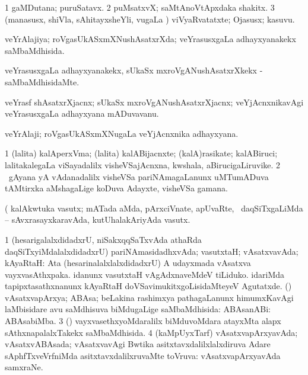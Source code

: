 \bentry
{} 
\gl{\nA}
\expl{}
\bmng
\bnum
\num{1} gaMDutana; puruSatavx. 
\num{2} puMsatxvX; saMtAnoVtApxdaka shakitx. 
\num{3} (manasusx, shiVla, sAhitayxsheYli, \mo vugaLa \vi) viVyaRvatatxte; Ojasusx; kasuvu. 
\enum
\emng
\eentry

\bentry 
{} 
\gl{\gu}
\expl{}
\bmng
 veYrAlajiya; roVgasUkASxmXNushAsatxrXda; veYrasusxgaLa adhayxyanakekx saMbaMdhisida. 
\emng
\eentry

\bentry
{} 
\gl{\kirxvi}
\expl{}
\bmng
 veYrasusxgaLa adhayxyanakekx, sUkaSx mxroVgANushAsatxrXkekx -saMbaMdhisidaMte. 
\emng
\eentry

\bentry
{} 
\gl{\nA}
\expl{}
\bmng
 veYrasf shAsatxrXjacnx; sUkaSx mxroVgANushAsatxrXjacnx; veYjAcnxnikavAgi veYrasusxgaLa adhayxyana mADuvavanu. 
\emng
\eentry

\bentry
{} 
\gl{\nA}
\expl{}
\bmng
 veYrAlaji; roVgasUkASxmXNugaLa veYjAcnxnika adhayxyana. 
\emng
\eentry

\bentry
{} 
\gl{\nA}
\expl{}
\bmng
\bnum
\num{1} (lalita) kalAperxVma; (lalita) kalABijacnxte; (kalA)rasikate; kalABiruci; lalitakalegaLa viSayadalilx visheVSajAcnxna, kwshala, aBirucigaLiruvike. 
\hypertarget{virtu(2)}{} 
\num{2} \kanmu\ gAyana yA vAdanadalilx visheVSa pariNAmagaLanunx uMTumADuva tAMtirxka aMshagaLige koDuva Adayxte, visheVSa gamana. 
\enum
\emng

\noindent 
\gl{\pagu}
\expl{}
\bmng
  (  kalAkwtuka vasutx; mATada aMda, pArxciVnate, apUvaRte, \mo\ daqSiTxgaLiMda -- sAvxrasayxkaravAda, kutUhalakAriyAda vasutx. 
\emng
\eentry

\bentry 
{} 
\gl{\gu}
\expl{}
\bmng
\bnum
\num{1} (hesarigalalxdidadxrU, niSakxqqSaTxvAda athaRda daqSiTxyiMdalalxdidadxrU) pariNAmasidadhxvAda; vasutxtaH; vAsatxvavAda; kAyaRtaH:  Ata (hesarinalalxlalxdidadxrU) A udayxmada vAsatxva vayxvasAthxpaka.  idanunx vasutxtaH vAgAdxnaveMdeV tiLiduko.  idariMda tapipxtasathxnanunx kAyaRtaH doVSavimukitxgoLisidaMteyeV Agutatxde. (\daqvi) vAsatxvapArxya; ABAsa; beLakina rashimxya pathagaLanunx himumxKavAgi laMbisidare avu saMdhisuva biMdugaLige saMbaMdhisida:  ABAsanABi:  ABAsabiMba. 
\num{3} (\yaMshA) vayxvasethxyoMdaralilx biMduvoMdara atayxMta alapx sAthxnapalalxTakekx saMbaMdhisida. 
\num{4} (kaMpUyxTarf) vAsatxvapArxyavAda; vAsatxvABAsada; vAsatxvavAgi Bwtika asitxtavxdalilxlalxdiruva Adare sAphfTxveVrfniMda asitxtavxdalilxruvaMte toVruva:  vAsatxvapArxyavAda samxraNe. 
\enum
\emng
\eentry

